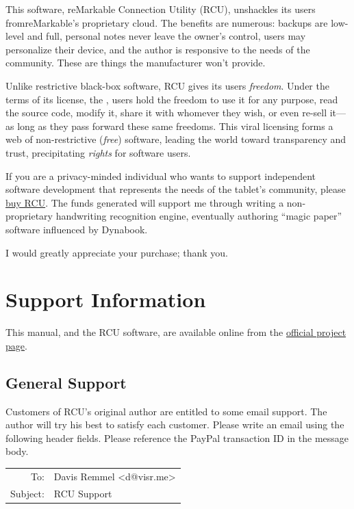 \documentclass{memoir}
\begin{document}
{This software, reMarkable Connection Utility (RCU), unshackles its users from\break reMarkable's proprietary cloud. The benefits are numerous: backups are low-level and full, personal notes never leave the owner's control, users may personalize their device, and the author is responsive to the needs of the community. These are things the manufacturer won't provide.

Unlike restrictive black-box software, RCU gives its users \textit{freedom}. Under the terms of its license, the , users hold the freedom to use it for any purpose, read the source code, modify it, share it with whomever they wish, or even re-sell it---as long as they pass forward these same freedoms. This viral licensing forms a web of non-restrictive (\textit{free}) software, leading the world toward transparency and trust, precipitating \textit{rights} for software users.

If you are a privacy-minded individual who wants to support independent software development that represents the needs of the tablet's community, please \href{http://www.davisr.me/projects/rcu/}{buy RCU}. The funds generated will support me through writing a non-proprietary handwriting recognition engine, eventually authoring ``magic paper'' software influenced by Dynabook.

I would greatly appreciate your purchase; thank you.

\vspace{1.5cm}



\chapter{Support Information}
This manual, and the RCU software, are available online from the \href{http://www.davisr.me/projects/rcu/}{official project page}.

\section{General Support}

Customers of RCU's original author are entitled to some email support. The author will try his best to satisfy each customer. Please write an email using the following header fields. Please reference the PayPal transaction ID in the message body.

\vspace{0.5cm}
\begin{tabular}{rl}
To:& Davis Remmel \textless d@visr.me\textgreater \\
Subject:& RCU Support
\end{tabular}


}
\end{document}
